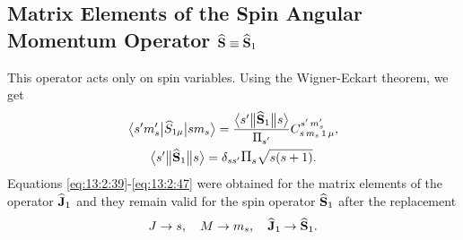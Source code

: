 \subsection{Matrix Elements of the Spin Angular Momentum Operator \(\widehat{\mathbf{S}} \equiv \widehat{\mathbf{S}}_{1}\)}\label{sec:13.2.7}
This operator acts only on spin variables. Using the Wigner-Eckart theorem, we get
\begin{gather}
\braOket{ s^{\prime} m_{s}^{\prime}}{ \widehat{S}_{1 \mu}}{s m_{s}}=\frac{
\braOketred{ s^{\prime}}{\widehat{\vect{S}}_{1}}{ s}}{\Fact{s^{\prime}}} 
\clebsch{s}{m_{s}}{1}{\mu}{s^{\prime}}{m_{s}^{\prime}},  \label{eq:13:2:94}\\
\braOketred{ s^{\prime}}{\widehat{\vect{S}}_{1}}{ s}=\delta_{s s^{\prime}} \Fact{s}\sqrt{s(s+1)}. \label{eq:13:2:95}
\end{gather}
Equations \eqref{eq:13:2:39}-\eqref{eq:13:2:47} were obtained for the matrix elements of the operator \(\widehat{\mathbf{J}}_{1}\) and they remain valid for the spin operator \(\widehat{\mathbf{S}}_{1}\) after the replacement
\begin{equation*}
J \rightarrow s, \quad M \rightarrow m_{s}, \quad \widehat{\mathbf{J}}_{1} \rightarrow \widehat{\mathbf{S}}_{1}.
\end{equation*}

